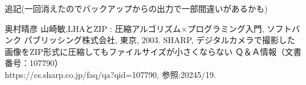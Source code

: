 \documentclass[documentclass]{jsarticle}
\begin{document}
追記(一回消えたのでバックアップからの出力で一部間違いがあるかも)

\newpage
\begin{thebibliography}{9}
   奥村晴彦 山崎敏,LHAとZIP : 圧縮アルゴリズム×プログラミング入門, ソフトバンク パブリッシング株式会社, 東京, 2003.
   SHARP, デジタルカメラで撮影した画像をZIP形式に圧縮してもファイルサイズが小さくならない Ｑ＆Ａ情報（文書番号：107790）\\
  https://cs.sharp.co.jp/faq/qa?qid=107790, 参照:20245/19.
\end{thebibliography}
\end{document}
